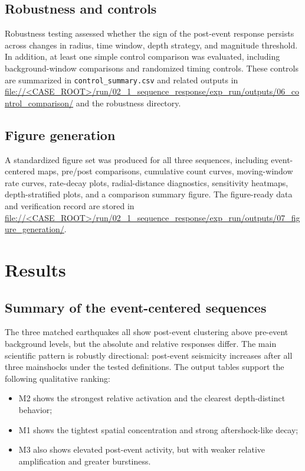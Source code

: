 \documentclass[11pt]{article}
\begin{document}
\subsection{Robustness and controls}
Robustness testing assessed whether the sign of the post-event response persists across changes in radius, time window, depth strategy, and magnitude threshold. In addition, at least one simple control comparison was evaluated, including background-window comparisons and randomized timing controls. These controls are summarized in \texttt{control\_summary.csv} and related outputs in \url{file://<CASE_ROOT>/run/02_1_sequence_response/exp_run/outputs/06_control_comparison/} and the robustness directory.

\subsection{Figure generation}
A standardized figure set was produced for all three sequences, including event-centered maps, pre/post comparisons, cumulative count curves, moving-window rate curves, rate-decay plots, radial-distance diagnostics, sensitivity heatmaps, depth-stratified plots, and a comparison summary figure. The figure-ready data and verification record are stored in \url{file://<CASE_ROOT>/run/02_1_sequence_response/exp_run/outputs/07_figure_generation/}.

\section{Results}
\subsection{Summary of the event-centered sequences}
The three matched earthquakes all show post-event clustering above pre-event background levels, but the absolute and relative responses differ. The main scientific pattern is robustly directional: post-event seismicity increases after all three mainshocks under the tested definitions. The output tables support the following qualitative ranking:
\begin{itemize}[leftmargin=1.2em]
    \item M2 shows the strongest relative activation and the clearest depth-distinct behavior;
    \item M1 shows the tightest spatial concentration and strong aftershock-like decay;
    \item M3 also shows elevated post-event activity, but with weaker relative amplification and greater burstiness.
\end{itemize}
\end{document}
